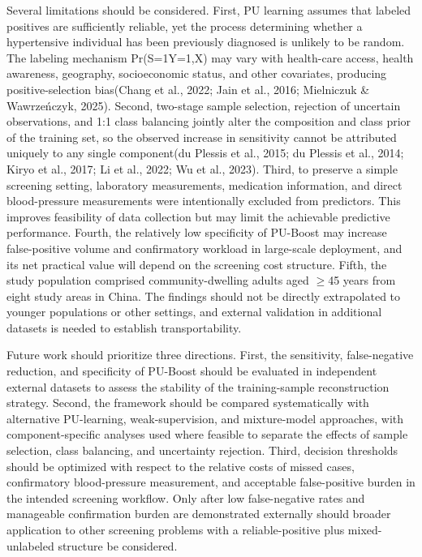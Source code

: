 \documentclass[10pt]{article}
\begin{document}
Several limitations should be considered. First, PU learning assumes
that labeled positives are sufficiently reliable, yet the process
determining whether a hypertensive individual has been previously
diagnosed is unlikely to be random. The labeling mechanism
Pr(S=1\textbar Y=1,X) may vary with health-care access, health
awareness, geography, socioeconomic status, and other covariates,
producing positive-selection bias(Chang et al., 2022; Jain et al., 2016;
Mielniczuk \& Wawrzeńczyk, 2025). Second, two-stage sample selection,
rejection of uncertain observations, and 1:1 class balancing jointly
alter the composition and class prior of the training set, so the
observed increase in sensitivity cannot be attributed uniquely to any
single component(du Plessis et al., 2015; du Plessis et al., 2014; Kiryo
et al., 2017; Li et al., 2022; Wu et al., 2023). Third, to preserve a
simple screening setting, laboratory measurements, medication
information, and direct blood-pressure measurements were intentionally
excluded from predictors. This improves feasibility of data collection
but may limit the achievable predictive performance. Fourth, the
relatively low specificity of PU-Boost may increase false-positive
volume and confirmatory workload in large-scale deployment, and its net
practical value will depend on the screening cost structure. Fifth, the
study population comprised community-dwelling adults aged $\geq$45 years from
eight study areas in China. The findings should not be directly
extrapolated to younger populations or other settings, and external
validation in additional datasets is needed to establish
transportability.

Future work should prioritize three directions. First, the sensitivity,
false-negative reduction, and specificity of PU-Boost should be
evaluated in independent external datasets to assess the stability of
the training-sample reconstruction strategy. Second, the framework
should be compared systematically with alternative PU-learning,
weak-supervision, and mixture-model approaches, with component-specific
analyses used where feasible to separate the effects of sample
selection, class balancing, and uncertainty rejection. Third, decision
thresholds should be optimized with respect to the relative costs of
missed cases, confirmatory blood-pressure measurement, and acceptable
false-positive burden in the intended screening workflow. Only after low
false-negative rates and manageable confirmation burden are demonstrated
externally should broader application to other screening problems with a
reliable-positive plus mixed-unlabeled structure be considered.
\end{document}
